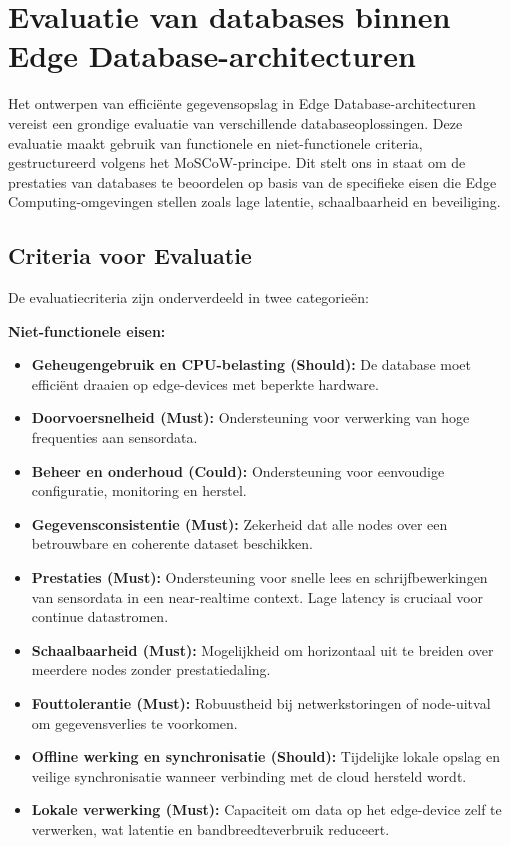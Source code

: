 \newpage

\section{Evaluatie van databases binnen Edge Database-architecturen}

    Het ontwerpen van efficiënte gegevensopslag in Edge Database-architecturen vereist een grondige evaluatie van verschillende databaseoplossingen. Deze evaluatie maakt gebruik van functionele en niet-functionele criteria, gestructureerd volgens het MoSCoW-principe. Dit stelt ons in staat om de prestaties van databases te beoordelen op basis van de specifieke eisen die Edge Computing-omgevingen stellen zoals lage latentie, schaalbaarheid en beveiliging.

    \subsection{Criteria voor Evaluatie}
    De evaluatiecriteria zijn onderverdeeld in twee categorieën:

    \textbf{Niet-functionele eisen:}
    \begin{itemize}
        \item \textbf{Geheugengebruik en CPU-belasting (Should):} De database moet efficiënt draaien op edge-devices met beperkte hardware.
        \item \textbf{Doorvoersnelheid (Must):} Ondersteuning voor verwerking van hoge frequenties aan sensordata.
        \item \textbf{Beheer en onderhoud (Could):} Ondersteuning voor eenvoudige configuratie, monitoring en herstel.
        \item \textbf{Gegevensconsistentie (Must):} Zekerheid dat alle nodes over een betrouwbare en coherente dataset beschikken.
        \item \textbf{Prestaties (Must):} Ondersteuning voor snelle lees en schrijfbewerkingen van sensordata in een near-realtime context. Lage latency is cruciaal voor continue datastromen.
        \item \textbf{Schaalbaarheid (Must):} Mogelijkheid om horizontaal uit te breiden over meerdere nodes zonder prestatiedaling.
        \item \textbf{Fouttolerantie (Must):} Robuustheid bij netwerkstoringen of node-uitval om gegevensverlies te voorkomen.
        \item \textbf{Offline werking en synchronisatie (Should):} Tijdelijke lokale opslag en veilige synchronisatie wanneer verbinding met de cloud hersteld wordt.
        \item \textbf{Lokale verwerking (Must):} Capaciteit om data op het edge-device zelf te verwerken, wat latentie en bandbreedteverbruik reduceert.
    \end{itemize}

